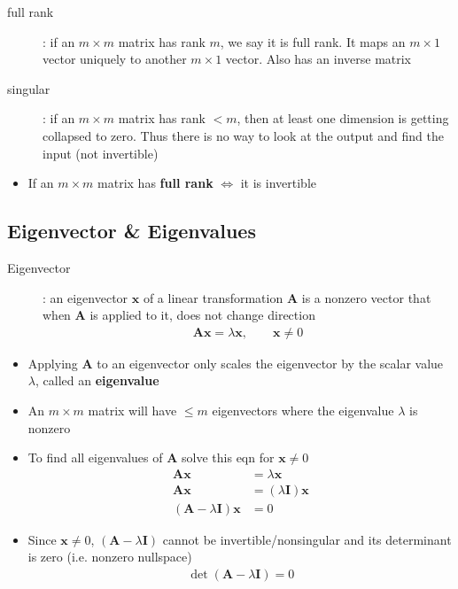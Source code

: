 \documentclass[letterpaper,12pt]{article}
\newcommand{\vect}[1]{\mathbf{#1}}
\newcommand{\matr}[1]{\mathbf{#1}}
\begin{document}
\begin{description}
 \item[full rank]: if an $m \times m$ matrix has rank $m$, we say it is full rank. It maps an $m \times 1$ vector uniquely to another $m \times 1$ vector. Also has an inverse matrix
 \item[singular]: if an $m \times m$ matrix has rank $< m$, then at least one dimension is getting collapsed to zero. Thus there is no way to look at the output and find the input (not invertible)
\end{description}

\begin{itemize}
 \item If an $m \times m$ matrix has \textbf{full rank} $\iff$ it is invertible
\end{itemize}

\subsection{Eigenvector \& Eigenvalues}
\begin{description}
 \item[Eigenvector]: an eigenvector $\vect{x}$ of a linear transformation $\matr{A}$ is a nonzero vector that when $\matr{A}$ is applied to it, does not change direction
       \begin{align}
        \matr{A}\vect{x} = \lambda\vect{x}, \quad\quad \vect{x} \neq 0
       \end{align}
\end{description}

\begin{itemize}
 \item Applying $\matr{A}$ to an eigenvector only scales the eigenvector by the scalar value $\lambda$, called an \textbf{eigenvalue}
 \item An $m \times m$ matrix will have $\leq m$ eigenvectors where the eigenvalue $\lambda$ is nonzero
 \item To find all eigenvalues of $\matr{A}$ solve this eqn for $\vect{x} \neq 0$
       \begin{align}
        \matr{A}\vect{x}                     & = \lambda\vect{x}           \\
        \matr{A}\vect{x}                     & = (\lambda\matr{I})\vect{x} \\
        (\matr{A} - \lambda\matr{I})\vect{x} & = 0
       \end{align}
 \item Since $\vect{x} \neq 0$, $(\matr{A} - \lambda\matr{I})$ cannot be invertible/nonsingular and its determinant is zero (i.e. nonzero nullspace)
       \begin{align}
        \det(\matr{A} - \lambda\matr{I}) = 0
       \end{align}
\end{itemize}
\end{document}
